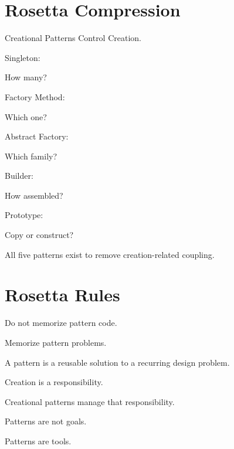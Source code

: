 \documentclass[11pt,a4paper]{book}
\begin{document}

\section{Rosetta Compression}

\begin{compressionbox}

Creational Patterns Control Creation.

Singleton:

How many?

Factory Method:

Which one?

Abstract Factory:

Which family?

Builder:

How assembled?

Prototype:

Copy or construct?

All five patterns exist to remove
creation-related coupling.

\end{compressionbox}


\section{Rosetta Rules}

\begin{rosettarule}

Do not memorize pattern code.

Memorize pattern problems.

\end{rosettarule}

\begin{rosettarule}

A pattern is a reusable solution to a recurring
design problem.

\end{rosettarule}

\begin{rosettarule}

Creation is a responsibility.

Creational patterns manage that responsibility.

\end{rosettarule}

\begin{rosettarule}

Patterns are not goals.

Patterns are tools.

\end{rosettarule}
\end{document}
